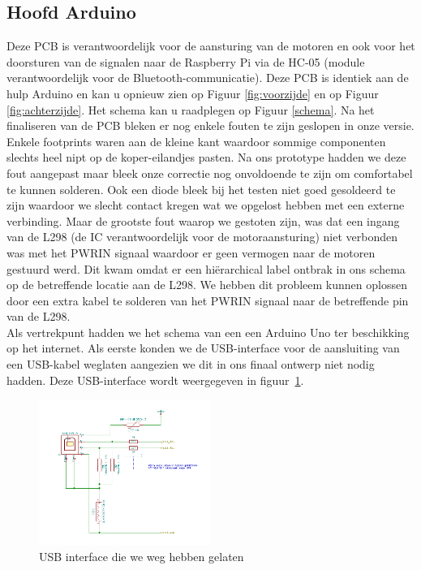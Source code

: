 \subsection{Hoofd Arduino}
Deze PCB is verantwoordelijk voor de aansturing van de motoren en ook voor het doorsturen van de signalen naar de Raspberry Pi via de HC-05 (module verantwoordelijk voor de Bluetooth-communicatie). Deze PCB is identiek aan de hulp Arduino en kan u opnieuw zien op Figuur \ref{fig:voorzijde} en op Figuur \ref{fig:achterzijde}. Het schema kan u raadplegen op Figuur \ref{schema}. Na het finaliseren van de PCB bleken er nog enkele fouten te zijn geslopen in onze versie. Enkele footprints waren aan de kleine kant waardoor sommige componenten slechts heel nipt op de koper-eilandjes pasten. Na ons prototype hadden we deze fout aangepast maar bleek onze correctie nog onvoldoende te zijn om comfortabel te kunnen solderen. Ook een diode bleek bij het testen niet goed gesoldeerd te zijn waardoor we slecht contact kregen wat we opgelost hebben met een externe verbinding. Maar de grootste fout waarop we gestoten zijn, was dat een ingang van de L298 (de IC verantwoordelijk voor de motoraansturing) niet verbonden was met het PWRIN signaal waardoor er geen vermogen naar de motoren gestuurd werd. Dit kwam omdat er een hi\"erarchical label ontbrak in ons schema op de betreffende locatie aan de L298. We hebben dit probleem kunnen oplossen door een extra kabel te solderen van het PWRIN signaal naar de betreffende pin van de L298. \\
Als vertrekpunt hadden we het schema van een een Arduino Uno ter beschikking op het internet. Als eerste konden we de USB-interface voor de aansluiting van een USB-kabel weglaten aangezien we dit in ons finaal ontwerp niet nodig hadden. Deze USB-interface wordt weergegeven in figuur~\ref{fig:USB-interface}.
\begin{figure}[h]
\centering
\includegraphics[width=0.5\textwidth]{USB_Interface.png}
\caption{USB interface die we weg hebben gelaten}
\label{fig:USB-interface}
\end{figure}
